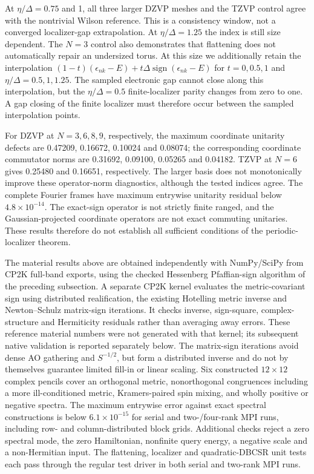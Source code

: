 \documentclass[11pt]{article}
\begin{document}
At $\eta/\Delta=0.75$ and 1, all three larger DZVP meshes and the
TZVP control agree with the nontrivial Wilson reference. This is
a consistency window, not a converged localizer-gap extrapolation.
At $\eta/\Delta=1.25$ the index is still size dependent.
The $N=3$ control also demonstrates that flattening does not
automatically repair an undersized torus. At this size we additionally
retain the interpolation
$(1-t)(\epsilon_{nk}-E)+t\Delta\operatorname{sign}(\epsilon_{nk}-E)$
for $t=0,0.5,1$ and $\eta/\Delta=0.5,1,1.25$.
The sampled electronic gap cannot close along this interpolation,
but the $\eta/\Delta=0.5$ finite-localizer parity changes from
zero to one. A gap closing of the finite localizer must therefore
occur between the sampled interpolation points.

For DZVP at $N=3,6,8,9$, respectively, the maximum coordinate
unitarity defects are 0.47209, 0.16672, 0.10024 and 0.08074;
the corresponding coordinate commutator norms are 0.31692,
0.09100, 0.05265 and 0.04182. TZVP at $N=6$ gives 0.25480
and 0.16651, respectively. The larger basis does not monotonically
improve these operator-norm diagnostics, although the tested
indices agree. The complete Fourier frames have maximum entrywise
unitarity residual below $4.8\times10^{-14}$.
The exact-sign operator is not strictly finite ranged, and the
Gaussian-projected coordinate operators are not exact commuting
unitaries. These results therefore do not establish all sufficient
conditions of the periodic-localizer theorem.

The material results above are obtained independently with
NumPy/SciPy from CP2K full-band exports, using the checked
Hessenberg Pfaffian-sign algorithm of the preceding subsection.
A separate CP2K kernel evaluates the metric-covariant sign using
distributed realification, the existing Hotelling metric inverse
and Newton--Schulz matrix-sign iterations. It checks inverse,
sign-square, complex-structure and Hermiticity residuals rather
than averaging away errors. These reference material numbers were
not generated with that kernel; its subsequent native validation
is reported separately below. The matrix-sign iterations avoid
dense AO gathering and $S^{-1/2}$, but form a distributed inverse
and do not by themselves guarantee limited fill-in or linear scaling.
Six constructed $12\times12$ complex pencils cover an orthogonal
metric, nonorthogonal congruences including a more ill-conditioned
metric, Kramers-paired spin mixing, and wholly positive or negative
spectra. The maximum entrywise error against exact spectral
constructions is below $6.1\times10^{-15}$ for serial and two-/four-rank
MPI runs, including row- and column-distributed block grids.
Additional checks reject a zero spectral mode, the zero Hamiltonian,
nonfinite query energy, a negative scale and a non-Hermitian input.
The flattening, localizer and quadratic-DBCSR unit tests each pass
through the regular test driver in both serial and two-rank MPI runs.
\end{document}
